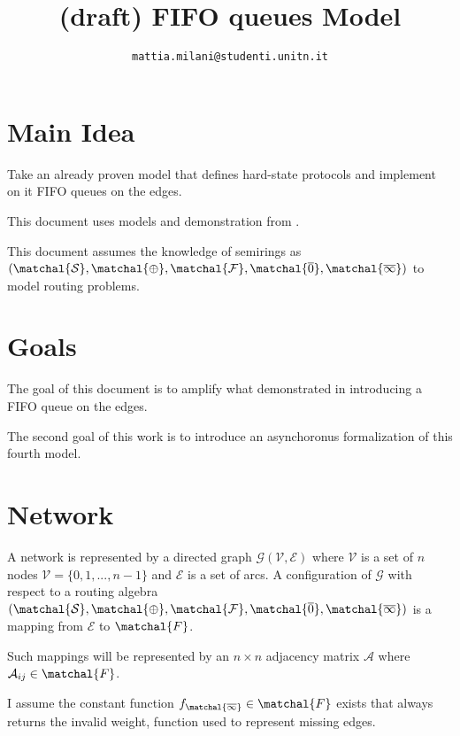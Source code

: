 \documentclass[10pt,conference,letterpaper]{IEEEtran}
\theoremstyle{definition}
\theoremstyle{remark}
\newcommand{\nodeset}{\ensuremath{\mathcal{V}}\xspace}
\newcommand{\edgeset}{\ensuremath{\mathcal{E}}\xspace}
\newcommand{\graphg}{\ensuremath{\mathcal{G}}\xspace}
\newcommand{\graph}{\ensuremath{\mathcal{\graphg(\nodeset,\edgeset)}}\xspace}
\newcommand{\semiringset}{\ensuremath{\matchal{S}}\xspace}
\newcommand{\semiringchoice}{\ensuremath{\matchal{\oplus}}\xspace}
\newcommand{\semiringfunctions}{\ensuremath{\matchal{F}}\xspace}
\newcommand{\semiringempty}{\ensuremath{\matchal{\overline{\rm 0}}}\xspace}
\newcommand{\semiringinvalid}{\ensuremath{\matchal{\overline{\rm \infty}}}\xspace}
\newcommand{\semiring}{\ensuremath{\mathcal{(\semiringset, \semiringchoice, \semiringfunctions, \semiringempty, \semiringinvalid)}}\xspace}
\newcommand{\invalidfunction}{\ensuremath{f_\semiringinvalid}\xspace}
\newcommand{\Amatrix}{\ensuremath{\mathcal{A}}\xspace}
\newcommand{\Amatrixelem}{\ensuremath{\Amatrix_{ij}}\xspace}
\begin{document}
\title{(draft) FIFO queues Model}
\author{
    \texttt{mattia.milani@studenti.unitn.it}
}


\maketitle

\section{Main Idea}
\label{sec:mainIdea}

Take an already proven model that defines hard-state protocols and implement
on it FIFO queues on the edges.

This document uses models and demonstration from \cite{AgdaHardStateVectoringRouting}.

This document assumes the knowledge of semirings as \semiring to model routing
problems.

\section{Goals}
\label{sec:goals}

The goal of this document is to amplify what demonstrated in \cite{AgdaHardStateVectoringRouting}
introducing a FIFO queue on the edges.

The second goal of this work is to introduce an asynchoronus formalization of this
fourth model.

\section{Network}
\label{sec:network}

A network is represented by a directed graph \graph where \nodeset is a set of
$n$ nodes $\nodeset=\{0,1, ... , n-1\}$ and \edgeset is a set of arcs.
A configuration of \graphg with respect to a routing algebra \semiring is a mapping
from \edgeset to \semiringfunctions.

Such mappings will be represented by an $n \times n$ adjacency matrix \Amatrix where
$\Amatrixelem \in \semiringfunctions$. 

I assume the constant function $\invalidfunction \in \semiringfunctions$ exists that always returns the invalid
weight, function used to represent missing edges.
\end{document}
